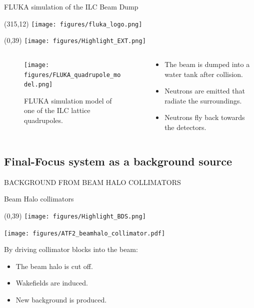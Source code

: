 \documentclass[xcolor={dvipsnames}]{beamer}
\newcommand{\flukalogo}{
  \setlength{\TPHorizModule}{1pt}
  \setlength{\TPVertModule}{1pt}
  \begin{textblock}{1}(315,12)
   \texttt{[image: figures/fluka\_logo.png]}
  \end{textblock}
}
\newcommand{\BDSsymbol}{
  \setlength{\TPHorizModule}{1pt}
  \setlength{\TPVertModule}{1pt}
  \begin{textblock}{1}(0,39)
   \texttt{[image: figures/Highlight\_BDS.png]}
  \end{textblock}
}
\newcommand{\EXTsymbol}{
  \setlength{\TPHorizModule}{1pt}
  \setlength{\TPVertModule}{1pt}
  \begin{textblock}{1}(0,39)
   \texttt{[image: figures/Highlight\_EXT.png]}
  \end{textblock}
}
\begin{document}
\begin{frame}{FLUKA simulation of the ILC Beam Dump}
\flukalogo
\EXTsymbol
\begin{columns}[T]
\begin{column}[b]{0.4\textwidth}
 \begin{figure}
 \centering
\texttt{[image: figures/FLUKA\_quadrupole\_model.png]}
\caption{\small FLUKA simulation model of one of the ILC lattice quadrupoles.}
\end{figure}
\end{column}
\begin{column}[b]{0.6\textwidth}
\begin{itemize}
 \item The beam is dumped into a water tank after collision.
 \item Neutrons are emitted that radiate the surroundings.
 \item Neutrons fly back towards the detectors.
\end{itemize}
\vspace*{0.5cm}
\end{column}
\end{columns}
\end{frame}

\subsection{Final-Focus system as a background source}
\begin{frame}
 \begin{center}
  \alert{\MakeUppercase{Background from Beam Halo collimators}}
 \end{center}
\end{frame}

\begin{frame}{Beam Halo collimators}
\BDSsymbol
 \begin{center}
\texttt{[image: figures/ATF2\_beamhalo\_collimator.pdf]}
\end{center}
By driving collimator blocks into the beam:\\
\begin{itemize}
 \item The beam halo is cut off.
 \item Wakefields are induced.
 \item New background is produced.
\end{itemize}

\end{frame}
\end{document}
